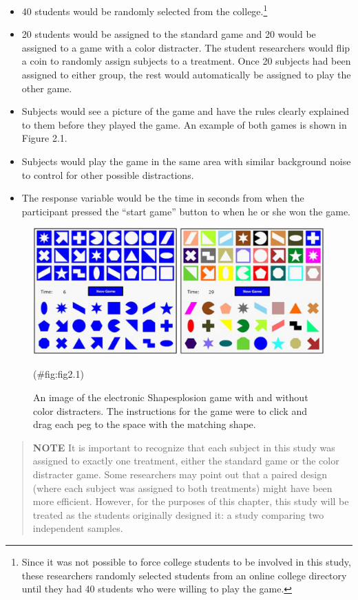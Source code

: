 \documentclass[
]{report}
\providecommand{\tightlist}{%
  \setlength{\itemsep}{0pt}\setlength{\parskip}{0pt}}
\begin{document}
\begin{itemize}
\tightlist
\item
  40 students would be randomly selected from the college.\footnote{Since it was not possible to force college students to be involved in this study, these researchers randomly selected students from an online college directory until they had 40 students who were willing to play the game.}
\item
  20 students would be assigned to the standard game and 20 would be assigned to a game with a color
  distracter. The student researchers would flip a coin to randomly assign subjects to a treatment. Once
  20 subjects had been assigned to either group, the rest would automatically be assigned to play the
  other game.
\item
  Subjects would see a picture of the game and have the rules clearly explained to them before they
  played the game. An example of both games is shown in Figure 2.1.
\item
  Subjects would play the game in the same area with similar background noise to control for other
  possible distractions.
\item
  The response variable would be the time in seconds from when the participant pressed the ``start
  game'' button to when he or she won the game.
\end{itemize}

\begin{figure}

{\centering \includegraphics[width=1\linewidth]{docs/Fig2_1Shapesplosion} 

}

\caption{An image of the electronic Shapesplosion game with and without color distracters. The instructions for the game were to click and drag each peg to the space with the matching shape.}(\#fig:fig2.1)
\end{figure}

\begin{quote}
\textbf{NOTE}
It is important to recognize that each subject in this study was assigned to exactly one treatment, either the standard game or the color distracter game. Some researchers may point out that a paired design (where each subject was assigned to both treatments) might have been more efficient. However, for the purposes of this chapter, this study will be treated as the students originally designed it: a study comparing two independent samples.
\end{quote}
\end{document}
